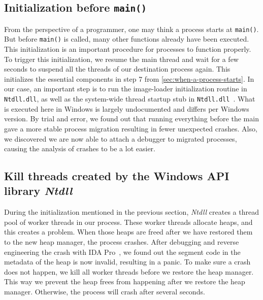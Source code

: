 \documentclass[a4paper, 11pt, english]{report}
\begin{document}
\subsection{Initialization before \texttt{main()}}
\label{sec:memory-main}
From the perspective of a programmer, one may think a process starts at \texttt{main()}. But before \texttt{main()} is called, many other functions already have been executed. This initialization is an important procedure for processes to function properly. To trigger this initialization, we resume the main thread and wait for a few seconds to suspend all the threads of our destination process again. 
This initializes the essential components in step 7 from \autoref{sec:when-a-process-starts}.
In our case, an important step is to run the image-loader initialization routine in \texttt{Ntdll.dll}, as well as the system-wide thread startup stub in \texttt{Ntdll.dll}~\cite[p. 149]{windows-internals}.
What is executed here in Windows is largely undocumented and differs per Windows version. By trial and error, we found out that running everything before the main gave a more stable process migration resulting in fewer unexpected crashes. 
Also, we discovered we are now able to attach a debugger to migrated processes, causing the analysis of crashes to be a lot easier.

\subsection{Kill threads created by the Windows API library \textit{Ntdll}}
\label{sec:killing-threads-memory}
During the initialization mentioned in the previous section, \textit{Ntdll} creates a thread pool of worker threads in our process. These worker threads allocate heaps, and this creates a problem. When those heaps are freed after we have restored them to the new heap manager, the process crashes. After debugging and reverse engineering the crash with IDA Pro~\cite{ida-pro}, we found out the segment code in the metadata of the heap is now invalid, resulting in a panic. To make sure a crash does not happen, we kill all worker threads before we restore the heap manager. This way we prevent the heap frees from happening after we restore the heap manager. Otherwise, the process will crash after several seconds.
\end{document}
